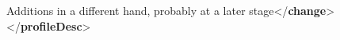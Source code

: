 \begin{shaded}
\hspace*{1em}\hspace*{1em}Additions in a different hand, probably at a later\mbox{}\newline 
\hspace*{1em}\hspace*{1em}\hspace*{1em}\hspace*{1em}\hspace*{1em}\hspace*{1em} stage{</\textbf{change}>}\mbox{}\newline 
\hspace*{1em}\mbox{}\newline 
{}\mbox{}\newline 
{</\textbf{profileDesc}>}\end{shaded}\egroup\par \par
